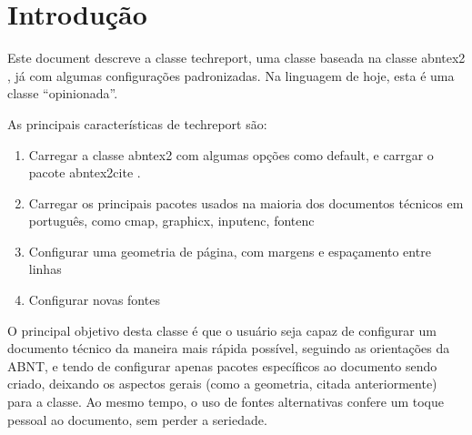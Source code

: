 \documentclass{techreport}
\renewcommand{\imprimircapa}{%
  \begin{capa}%
    
    \center
    {\ABNTEXchapterfont\Large\imprimirinstituicao}
    
    \vspace*{\fill}
    {\ABNTEXchapterfont\bfseries\LARGE\imprimirtitulo}
    \vspace*{\fill}

    \vspace*{\fill}
    {\ABNTEXchapterfont\large\imprimirautor}
    \vspace*{\fill}

    {\ABNTEXchapterfont\large\imprimirlocal}
    \par
    {\ABNTEXchapterfont\large\imprimirdata}

    \vspace*{1cm}

  \end{capa}
}
\newcommand{\trep}{\textsf{techreport}}
\begin{document}
\pretextual
\imprimircapa

\listoffigures*
\cleardoublepage

%
%
\tableofcontents*
\cleardoublepage

\textual


\chapter{Introdução}
\label{sec:introducao}

Este document descreve a classe \trep, uma classe baseada na classe \textsf{abntex2} \cite{bib:abntex2classe} , já com algumas configurações padronizadas. Na linguagem de hoje, esta é uma classe ``opinionada''.

As principais características de \trep{} são:

\begin{enumerate}
\item Carregar a classe \textsf{abntex2} com algumas opções como default, e carrgar o pacote \textsf{abntex2cite} \cite{abntex2cite}.
\item Carregar os principais pacotes usados na maioria dos documentos técnicos em português, como \textsf{cmap}, \textsf{graphicx}, \textsf{inputenc}, \textsf{fontenc}
\item Configurar uma geometria de página, com margens e espaçamento entre linhas
\item Configurar novas fontes
\end{enumerate}

O principal objetivo desta classe é que o usuário seja capaz de configurar um documento técnico da maneira mais rápida possível, seguindo as orientações da ABNT, e tendo de configurar apenas pacotes específicos ao documento sendo criado, deixando os aspectos gerais (como a geometria, citada anteriormente) para a classe. Ao mesmo tempo, o uso de fontes alternativas confere um toque pessoal ao documento, sem perder a seriedade.
\end{document}

